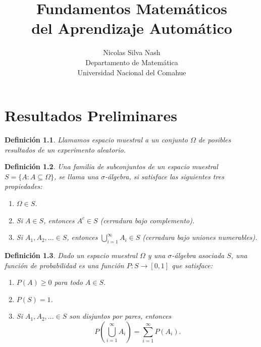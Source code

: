 \documentclass{report}
\newtheorem{dfn}{Definición}[subsection]
\begin{document}
\title{Fundamentos Matemáticos \\ del Aprendizaje Automático}
\author{Nicolas Silva Nash \\ Departamento de Matemática \\ Universidad Nacional del Comahue}
\maketitle
\tableofcontents
\chapter{Resultados Preliminares}

\begin{dfn}
    Llamamos \textit{espacio muestral} a un conjunto $\Omega$ de posibles resultados de un experimento aleatorio.
\end{dfn}
\begin{dfn}
Una familia de subconjuntos de un espacio muestral $S=\{A: A\subseteq\Omega\}$,  se llama una $\sigma$-\emph{álgebra}, si satisface las siguientes tres propiedades:

\begin{enumerate}
    \item \( \Omega \in S \).
    \item Si \( A \in S \), entonces \( A^c \in S \) (cerradura bajo complemento).
    \item Si \( A_1, A_2, \ldots \in S \), entonces \( \bigcup_{i=1}^\infty A_i \in S \) (cerradura bajo uniones numerables).
\end{enumerate}
\end{dfn}


\begin{dfn}
Dado un espacio muestral \( \Omega \) y una $\sigma$-álgebra asociada \( S \), 
una \emph{función de probabilidad} es una función \( P \colon S \to [0,1] \) que satisface:

\begin{enumerate}
    \item \( P(A) \geq 0 \) para todo \( A \in S \).
    \item \( P(S) = 1 \).
    \item Si \( A_1, A_2, \dots \in S \) son disjuntos por pares, entonces
    \[
        P\left( \bigcup_{i=1}^{\infty} A_i \right) = \sum_{i=1}^{\infty} P(A_i).
    \]
\end{enumerate}
\end{dfn}
\end{document}
